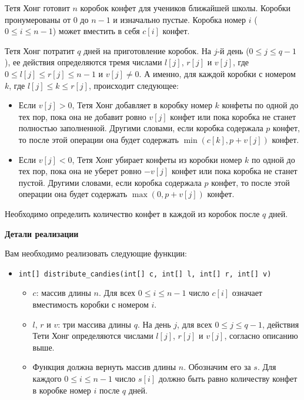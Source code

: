 Тетя Хонг готовит $n$ коробок конфет для учеников ближайшей школы.
Коробки пронумерованы от $0$ до $n-1$ и изначально пустые.
Коробка номер $i$ ($0 \leq i \leq n-1$) может вместить в себя $c[i]$ конфет.

Тетя Хонг потратит $q$ дней на приготовление коробок.
На $j$-й день ($0 \leq j \leq q-1$), ее действия определяются тремя числами $l[j]$, $r[j]$ и $v[j]$, где $0 \leq l[j] \leq r[j] \leq n-1$ и $v[j] \neq 0$. А именно, для каждой коробки с номером $k$, где $l[j] \leq k \leq r[j]$, происходит следующее:
\begin{itemize}
\item Если $v[j] > 0$, Тетя Хонг добавляет в коробку номер $k$ конфеты по одной до тех пор, пока она не добавит ровно $v[j]$ конфет или пока коробка не станет полностью заполненной. Другими словами, если коробка содержала $p$ конфет, то после этой операции она будет содержать $\min(c[k],p+v[j])$ конфет.

\item Если $v[j] < 0$, Тетя Хонг убирает конфеты из коробки номер $k$ по одной до тех пор, пока она не уберет ровно $-v[j]$ конфет или пока коробка не станет пустой. Другими словами, если коробка содержала $p$ конфет, то после этой операции она будет содержать $\max(0,p+v[j])$ конфет.
\end{itemize}

Необходимо определить количество конфет в каждой из коробок после $q$ дней.

\textbf{Детали реализации}

Вам необходимо реализовать следующие функции:
\begin{itemize}
\item  \texttt{int[] distribute\_candies(int[] c, int[] l, int[] r, int[] v)}
\begin{itemize}
\item $c$: массив длины $n$. Для всех $0 \leq i \leq n-1$ число $c[i]$ означает вместимость коробки с номером $i$.
\item $l$, $r$ и $v$: три массива длины $q$. На день $j$, для всех $0 \leq j \leq q-1$, действия Тети Хонг определяются числами $l[j]$, $r[j]$ и $v[j]$, согласно описанию выше.
\item Функция должна вернуть массив длины $n$. Обозначим его за $s$. Для каждого $0 \leq i \leq n-1$ число $s[i]$ должно быть равно количеству конфет в коробке номер $i$ после $q$ дней.
\end{itemize}
\end{itemize}
